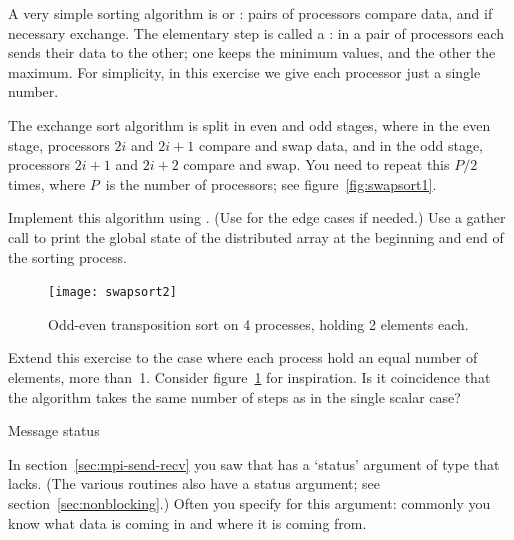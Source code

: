 \begin{exercise}
  \label{ex:exchangesort}
  A very simple sorting algorithm is  or
  :
  pairs of processors compare data, and if necessary exchange. The
  elementary step is called a : in a pair
  of processors each sends their data to the other; one keeps the
  minimum values, and the other the maximum.
  For simplicity, in this exercise we give each processor just a single number.

  The exchange sort algorithm is split in even and odd stages, where
  in the even stage, processors $2i$ and $2i+1$ compare and swap data,
  and in the odd stage, processors $2i+1$ and $2i+2$ compare and swap.
  You need to repeat this $P/2$ times, where $P$~is the number of
  processors; see figure~\ref{fig:swapsort1}.

  Implement this algorithm using . (Use
   for the edge cases if needed.)
  Use a gather call to print the global state of the distributed array
  at the beginning and end of the sorting process.
\end{exercise}

\begin{figure}[ht]
  \texttt{[image: swapsort2]}
  \caption{Odd-even transposition sort on 4 processes, holding 2
    elements each.}
  \label{fig:swapsort2}
\end{figure}

\begin{exercise}
  Extend this exercise to the case where each process hold an equal
  number of elements, more than~1. Consider figure~\ref{fig:swapsort2}
  for inspiration. Is it coincidence that the algorithm takes the same
  number of steps as in the single scalar case?
\end{exercise}

 {Message status}

In section~\ref{sec:mpi-send-recv}
you saw that  has a `status' argument
of type  that  lacks.
(The various   routines also have a status
argument; see section~\ref{sec:nonblocking}.)
Often you specify 
for this argument: commonly you know
what data is coming in and where it is coming from.

